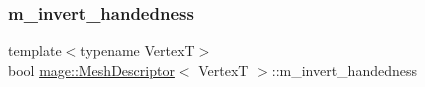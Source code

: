 \hypertarget{structmage_1_1_mesh_descriptor_af7b8124e44ac65ca2088d5d8ca0639f5}{}\label{structmage_1_1_mesh_descriptor_af7b8124e44ac65ca2088d5d8ca0639f5} 
\subsubsection{\texorpdfstring{m\+\_\+invert\+\_\+handedness}{m\_invert\_handedness}}
{\footnotesize\ttfamily template$<$typename VertexT$>$ \\
bool \hyperlink{structmage_1_1_mesh_descriptor}{mage\+::\+Mesh\+Descriptor}$<$ VertexT $>$\+::m\+\_\+invert\+\_\+handedness\hspace{0.3cm}{\ttfamily [private]}}

